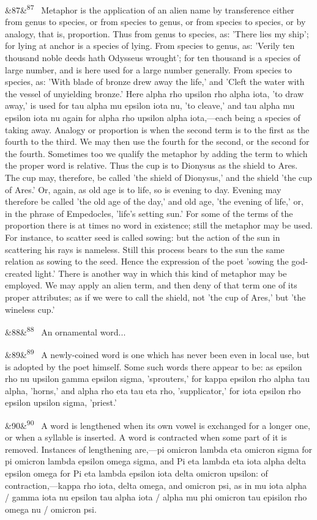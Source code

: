 \documentclass[12pt]{article}
\newcommand{\para}[1][]{\par\noindent\ifx&#1&\else\textsuperscript{\footnotesize #1}~\fi}
\begin{document}
\para[87] Metaphor is the application of an alien name by transference either from genus to species, or from species to genus, or from species to species, or by analogy, that is, proportion. Thus from genus to species, as: 'There lies my ship'; for lying at anchor is a species of lying. From species to genus, as: 'Verily ten thousand noble deeds hath Odysseus wrought'; for ten thousand is a species of large number, and is here used for a large number generally. From species to species, as: 'With blade of bronze drew away the life,' and 'Cleft the water with the vessel of unyielding bronze.' Here {alpha rho upsilon rho alpha iota}, 'to draw away,' is used for {tau alpha mu epsilon iota nu}, 'to cleave,' and {tau alpha mu epsilon iota nu} again for {alpha rho upsilon alpha iota},---each being a species of taking away. Analogy or proportion is when the second term is to the first as the fourth to the third. We may then use the fourth for the second, or the second for the fourth. Sometimes too we qualify the metaphor by adding the term to which the proper word is relative. Thus the cup is to Dionysus as the shield to Ares. The cup may, therefore, be called 'the shield of Dionysus,' and the shield 'the cup of Ares.' Or, again, as old age is to life, so is evening to day. Evening may therefore be called 'the old age of the day,' and old age, 'the evening of life,' or, in the phrase of Empedocles, 'life's setting sun.' For some of the terms of the proportion there is at times no word in existence; still the metaphor may be used. For instance, to scatter seed is called sowing: but the action of the sun in scattering his rays is nameless. Still this process bears to the sun the same relation as sowing to the seed. Hence the expression of the poet 'sowing the god-created light.' There is another way in which this kind of metaphor may be employed. We may apply an alien term, and then deny of that term one of its proper attributes; as if we were to call the shield, not 'the cup of Ares,' but 'the wineless cup.'

\para[88] {An ornamental word...}

\para[89] A newly-coined word is one which has never been even in local use, but is adopted by the poet himself. Some such words there appear to be: as {epsilon rho nu upsilon gamma epsilon sigma}, 'sprouters,' for {kappa epsilon rho alpha tau alpha}, 'horns,' and {alpha rho eta tau eta rho}, 'supplicator,' for {iota epsilon rho epsilon upsilon sigma}, 'priest.'

\para[90] A word is lengthened when its own vowel is exchanged for a longer one, or when a syllable is inserted. A word is contracted when some part of it is removed. Instances of lengthening are,---{pi omicron lambda eta omicron sigma} for {pi omicron lambda epsilon omega sigma}, and {Pi eta lambda eta iota alpha delta epsilon omega} for {Pi eta lambda epsilon iota delta omicron upsilon}: of contraction,---{kappa rho iota}, {delta omega}, and {omicron psi}, as in {mu iota alpha / gamma iota nu epsilon tau alpha iota / alpha mu phi omicron tau episilon rho omega nu / omicron psi}.
\end{document}
